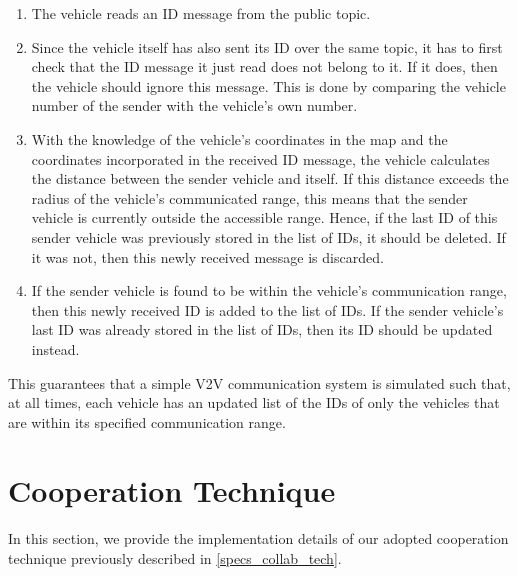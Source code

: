 \begin{enumerate}
    \item The vehicle reads an ID message from the public topic.
    \item Since the vehicle itself has also sent its ID over the same topic, it has to first check that the ID message it just read does not belong to it. If it does, then the vehicle should ignore this message. This is done by comparing the vehicle number of the sender with the vehicle’s own number.
    \item With the knowledge of the vehicle’s coordinates in the map and the coordinates incorporated in the received ID message, the vehicle calculates the distance between the sender vehicle and itself. If this distance exceeds the radius of the vehicle’s communicated range, this means that the sender vehicle is currently outside the accessible range. Hence, if the last ID of this sender vehicle was previously stored in the list of IDs, it should be deleted. If it was not, then this newly received message is discarded.
    \item If the sender vehicle is found to be within the vehicle’s communication range, then this newly received ID is added to the list of IDs. If the sender vehicle’s last ID was already stored in the list of IDs, then its ID should be updated instead.
\end{enumerate}

This guarantees that a simple V2V communication system is simulated such that, at all times, each vehicle has an updated list of the IDs of only the vehicles that are within its specified communication range.


\section{Cooperation Technique}
\label{method_collab_tech}
In this section, we provide the implementation details of our adopted cooperation technique previously described in \ref{specs_collab_tech}.

